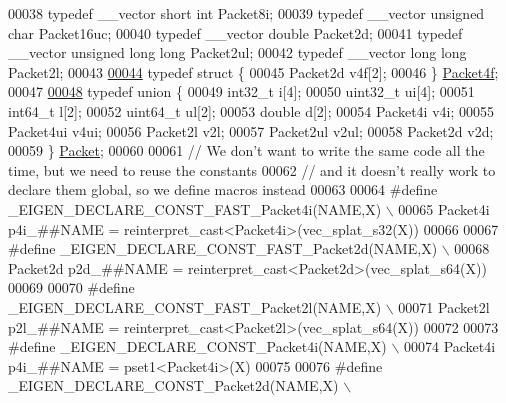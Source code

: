 \begin{DoxyCode}
00038 \textcolor{keyword}{typedef} \_\_vector \textcolor{keywordtype}{short} \textcolor{keywordtype}{int}           Packet8i;
00039 \textcolor{keyword}{typedef} \_\_vector \textcolor{keywordtype}{unsigned} \textcolor{keywordtype}{char}       Packet16uc;
00040 \textcolor{keyword}{typedef} \_\_vector \textcolor{keywordtype}{double}              Packet2d;
00041 \textcolor{keyword}{typedef} \_\_vector \textcolor{keywordtype}{unsigned} \textcolor{keywordtype}{long} \textcolor{keywordtype}{long}  Packet2ul;
00042 \textcolor{keyword}{typedef} \_\_vector \textcolor{keywordtype}{long} \textcolor{keywordtype}{long}           Packet2l;
00043 
\hyperlink{struct_eigen_1_1internal_1_1_packet4f}{00044} \textcolor{keyword}{typedef} \textcolor{keyword}{struct }\{
00045     Packet2d  v4f[2];
00046 \} \hyperlink{struct_eigen_1_1internal_1_1_packet4f}{Packet4f};
00047 
\hyperlink{union_eigen_1_1internal_1_1_packet}{00048} \textcolor{keyword}{typedef} \textcolor{keyword}{union }\{
00049   int32\_t   i[4];
00050   uint32\_t ui[4];
00051   int64\_t   l[2];
00052   uint64\_t ul[2];
00053   \textcolor{keywordtype}{double}    d[2];
00054   Packet4i  v4i;
00055   Packet4ui v4ui;
00056   Packet2l  v2l;
00057   Packet2ul v2ul;
00058   Packet2d  v2d;
00059 \} \hyperlink{union_eigen_1_1internal_1_1_packet}{Packet};
00060 
00061 \textcolor{comment}{// We don't want to write the same code all the time, but we need to reuse the constants}
00062 \textcolor{comment}{// and it doesn't really work to declare them global, so we define macros instead}
00063 
00064 \textcolor{preprocessor}{#define \_EIGEN\_DECLARE\_CONST\_FAST\_Packet4i(NAME,X) \(\backslash\)}
00065 \textcolor{preprocessor}{  Packet4i p4i\_##NAME = reinterpret\_cast<Packet4i>(vec\_splat\_s32(X))}
00066 
00067 \textcolor{preprocessor}{#define \_EIGEN\_DECLARE\_CONST\_FAST\_Packet2d(NAME,X) \(\backslash\)}
00068 \textcolor{preprocessor}{  Packet2d p2d\_##NAME = reinterpret\_cast<Packet2d>(vec\_splat\_s64(X))}
00069 
00070 \textcolor{preprocessor}{#define \_EIGEN\_DECLARE\_CONST\_FAST\_Packet2l(NAME,X) \(\backslash\)}
00071 \textcolor{preprocessor}{  Packet2l p2l\_##NAME = reinterpret\_cast<Packet2l>(vec\_splat\_s64(X))}
00072 
00073 \textcolor{preprocessor}{#define \_EIGEN\_DECLARE\_CONST\_Packet4i(NAME,X) \(\backslash\)}
00074 \textcolor{preprocessor}{  Packet4i p4i\_##NAME = pset1<Packet4i>(X)}
00075 
00076 \textcolor{preprocessor}{#define \_EIGEN\_DECLARE\_CONST\_Packet2d(NAME,X) \(\backslash\)}

\end{DoxyCode}
